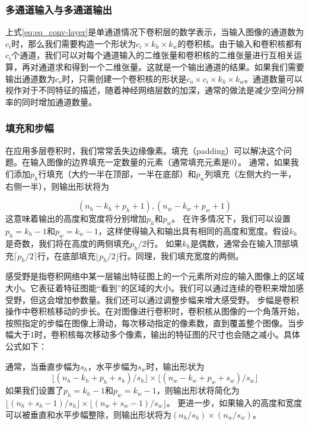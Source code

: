 \subsubsection{多通道输入与多通道输出}
上式\eqref{eq:eq_conv-layer}是单通道情况下卷积层的数学表示，当输入图像的通道数为$c_i$时，那么我们需要构造一个形状为$c_i\times k_h\times k_w$的卷积核。由于输入和卷积核都有$c_i$个通道，我们可以对每个通道输入的二维张量和卷积核的二维张量进行互相关运算，再对通道求和得到一个二维张量。这就是一个输出通道的结果。如果我们需要输出通道数为$c_o$时，只需创建一个卷积核的形状是$c_o\times c_i\times k_h\times k_w$。通道数量可以视作对于不同特征的描述，随着神经网络层数的加深，通常的做法是减少空间分辨率的同时增加通道数量。
\subsubsection{填充和步幅}
在应用多层卷积时，我们常常丢失边缘像素。填充（padding）可以解决这个问题。在输入图像的边界填充一定数量的元素（通常填充元素是$0$）。  
通常，如果我们添加$p_h$行填充（大约一半在顶部，一半在底部）和$p_w$列填充（左侧大约一半，右侧一半），则输出形状将为

\begin{equation}
  (n_h-k_h+p_h+1),(n_w-k_w+p_w+1)
\end{equation}
这意味着输出的高度和宽度将分别增加$p_h$和$p_w$。
在许多情况下，我们可以设置$p_h=k_h-1$和$p_w=k_w-1$，这样使得输入和输出具有相同的高度和宽度。假设$k_h$是奇数，我们将在高度的两侧填充$p_h/2$行。 如果$k_h$是偶数，通常会在输入顶部填充$\lceil p_h/2\rceil$行，在底部填充$\lfloor p_h/2\rfloor$行。同理，我们填充宽度的两侧。

感受野是指卷积网络中某一层输出特征图上的一个元素所对应的输入图像上的区域大小。它表征着特征图能“看到”的区域的大小。我们可以通过连续的卷积来增加感受野，但这会增加参数量。我们还可以通过调整步幅来增大感受野。
步幅是卷积操作中卷积核移动的步长。在对图像进行卷积时，卷积核从图像的一个角落开始，按照指定的步幅在图像上滑动，每次移动指定的像素数，直到覆盖整个图像。当步幅大于1时，卷积核每次移动多个像素，输出的特征图的尺寸也会随之减小。具体公式如下：

通常，当垂直步幅为$s_h$，水平步幅为$s_w$时，输出形状为
\begin{equation}
  \lfloor(n_h-k_h+p_h+s_h)/s_h\rfloor \times \lfloor(n_w-k_w+p_w+s_w)/s_w\rfloor
\end{equation}
如果我们设置了$p_h=k_h-1$和$p_w=k_w-1$，则输出形状将简化为$\lfloor(n_h+s_h-1)/s_h\rfloor \times \lfloor(n_w+s_w-1)/s_w\rfloor$。 更进一步，如果输入的高度和宽度可以被垂直和水平步幅整除，则输出形状将为$(n_h/s_h) \times (n_w/s_w)$。
